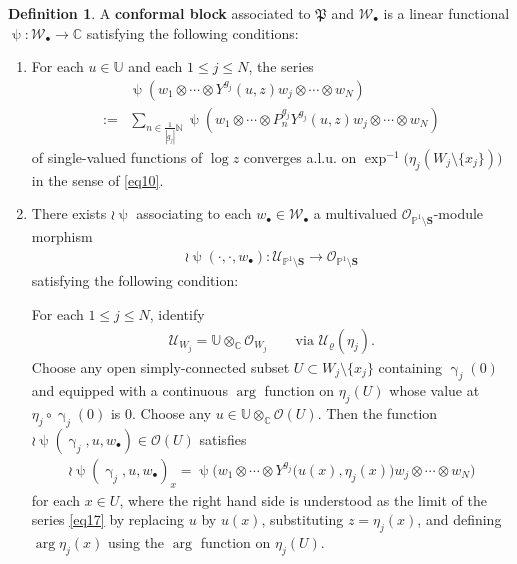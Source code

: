 \documentclass[12pt,a4paper,notitlepage]{article}
\theoremstyle{definition}
\newtheorem{df}{Definition}[subsection]
\theoremstyle{plain}
\newcommand{\fk}{\mathfrak}
\newcommand{\mc}{\mathcal}
\newcommand{\scr}{\mathscr}
\newcommand{\blt}{\bullet}
\newcommand{\Ubb}{\mathbb U}
\newcommand{\Cbb}{\mathbb C}
\newcommand{\Nbb}{\mathbb N}
\newcommand{\Pbb}{\mathbb P}
\newcommand{\Sbf}{\mathbf{S}}
\numberwithin{equation}{subsection}
\begin{document}
\begin{df}\label{lb8}
A \textbf{conformal block} associated to $\fk P$ and $\mc W_\blt$ is a linear functional $\uppsi:\mc W_\blt\rightarrow\Cbb$ satisfying the following conditions:
\begin{enumerate}
\item For each $u\in\Ubb$ and each $1\leq j\leq N$, the series
\begin{align}
&\uppsi(w_1\otimes\cdots\otimes Y^{g_j}(u,z)w_j\otimes\cdots\otimes w_N)\nonumber\\
:=&\sum_{n\in \frac 1{|g_j|}\Nbb}\uppsi(w_1\otimes\cdots\otimes P_n^{g_j}Y^{g_j}(u,z)w_j\otimes\cdots\otimes w_N)\label{eq17}
\end{align}
of single-valued functions of $\log z$ converges a.l.u. on $\exp^{-1}\big(\eta_j(W_j\setminus\{x_j\})\big)$  in the sense of \eqref{eq10}.
\item There exists $\wr\uppsi$ associating to each $w_\blt\in\mc W_\blt$ a multivalued $\scr O_{\Pbb^1\setminus\Sbf}$-module morphism 
\begin{align*}
\wr\uppsi(\cdot,\cdot,w_\blt):\scr U_{\Pbb^1\setminus\Sbf}\rightarrow\scr O_{\Pbb^1\setminus\Sbf}	
\end{align*}
satisfying the following condition: 

For each $1\leq j\leq N$,  identify 
\begin{align}
\scr U_{W_j}=\Ubb\otimes_\Cbb\scr O_{W_j}  \qquad\text{via }\mc U_\varrho(\eta_j).\label{eq38}
\end{align}
Choose   any open simply-connected subset $U\subset W_j\setminus\{x_j\}$ containing $\upgamma_j(0)$ and equipped with a continuous $\arg$ function on $\eta_j(U)$ whose value at $\eta_j\circ\upgamma_j(0)$ is $0$. Choose any $u\in\Ubb\otimes_\Cbb\scr O(U)$.  Then the function $\wr\uppsi(\upgamma_j,u,w_\blt)\in\scr O(U)$ satisfies   
\begin{align}
\wr\uppsi(\upgamma_j,u,w_\blt)_x=\uppsi\big(w_1\otimes\cdots\otimes Y^{g_j}\big(u(x),\eta_j(x)\big)w_j\otimes\cdots\otimes w_N\big)\label{eq18}	
\end{align}
for each $x\in U$, where the right hand side is understood as the limit of the series \eqref{eq17} by replacing $u$ by $u(x)$, substituting $z=\eta_j(x)$, and defining $\arg\eta_j(x)$ using the $\arg$ function on $\eta_j(U)$.
\end{enumerate}
\end{df}
\end{document}

